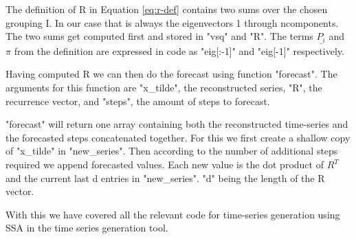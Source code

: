 The definition of R in Equation \eqref{eq:r-def} contains two sums over the chosen grouping I. In our case that is always the eigenvectors 1 through ncomponents. The two sums get computed first and stored in "vsq" and "R". The terms  $\underline{P_i}$ and $\pi$ from the definition are expressed in code as "eig[:-1]" and "eig[-1]" respectively. 

Having computed R we can then do the forecast using function "forecast". The arguments for this function are "x\_tilde", the reconstructed series, "R", the recurrence vector, and "steps", the amount of steps to forecast. 

"forecast" will return one array containing both the reconstructed time-series and the forecasted steps concatenated together. For this we first create a shallow copy of "x\_tilde" in "new\_series". Then according to the number of additional steps required we append forecasted values. Each new value is the dot product of $R^T$ and the current last d entries in "new\_series". "d" being the length of the R vector. 

With this we have covered all the relevant code for time-series generation using SSA in the time series generation tool. 